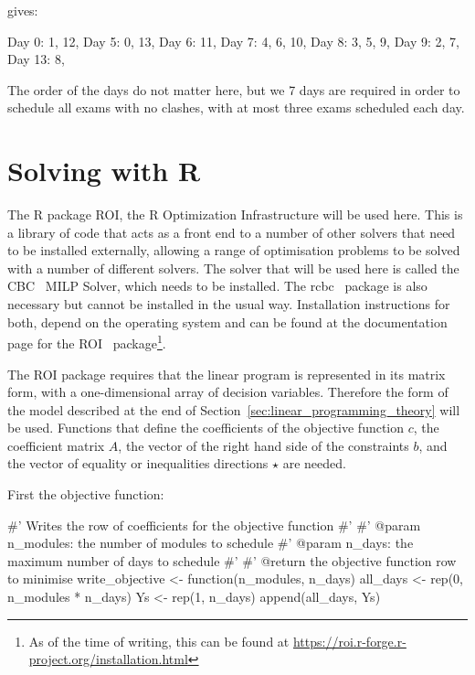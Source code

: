 gives:

\begin{pyout}

Day 0: 1, 12, 
Day 5: 0, 13, 
Day 6: 11, 
Day 7: 4, 6, 10, 
Day 8: 3, 5, 9, 
Day 9: 2, 7, 
Day 13: 8,
\end{pyout}

The order of the days do not matter here, but we 7 days are required in order to
schedule all exams with no clashes, with at most three exams scheduled each day.

\section{Solving with R}\label{sec:linear_programming_solving-with-R}

The R package ROI, the R Optimization Infrastructure will be used here.  This is
a library of code that acts as a front end to a number of other solvers that
need to be installed externally, allowing a range of optimisation problems to be
solved with a number of different solvers.  The solver that will be used here is
called the CBC~\cite{forrest2005cbc} MILP Solver, which needs to be
installed. The rcbc~\cite{shumacher2021rcbc} package is also necessary but
cannot be installed in the usual way. Installation instructions for both, depend
on the operating system and can be found at the documentation page for the
ROI~\cite{theussl2017roi} package\footnote{As of the time of writing, this
can be found at \url{https://roi.r-forge.r-project.org/installation.html}}.

The ROI package requires that the linear program is
represented in its matrix form, with a one-dimensional array of decision
variables. Therefore the form of the model described at the end of
Section~\ref{sec:linear_programming_theory} will be used.
Functions that define the coefficients of the objective function \(c\), the coefficient
matrix \(A\), the vector of the right hand side of the constraints \(b\), and the
vector of equality or inequalities directions \(\star\) are needed.

First the objective function:

\begin{Rin-no-test}
#' Writes the row of coefficients for the objective function
#'
#' @param n_modules: the number of modules to schedule
#' @param n_days: the maximum number of days to schedule
#'
#' @return the objective function row to minimise
write_objective <- function(n_modules, n_days){
  all_days <- rep(0, n_modules * n_days)
  Ys <- rep(1, n_days)
  append(all_days, Ys)
}
\end{Rin-no-test}

